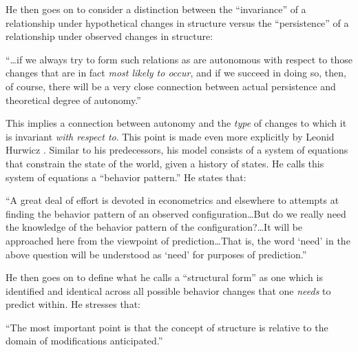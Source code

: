 \documentclass[a4paper,12pt]{article}
\begin{document}
He then goes on to consider a distinction between the ``invariance'' of a relationship under hypothetical changes in structure versus the ``persistence'' of a relationship under observed changes in structure:

\begin{displayquote}
``\ldots if we always try to form such relations as are autonomous with respect to those changes that are in fact \textit{most likely to occur}, and if we succeed in doing so, then, of course, there will be a very close connection between actual persistence and theoretical degree of autonomy.''
\end{displayquote}

This implies a connection between autonomy and the \textit{type} of changes to which it is invariant \textit{with respect to}. This point is made even more explicitly by Leonid Hurwicz \parencite*{Hurwicz1966}. Similar to his predecessors, his model consists of a system of equations that constrain the state of the world, given a history of states. He calls this system of equations a ``behavior pattern.'' He states that:

\begin{displayquote}
``A great deal of effort is devoted in econometrics and elsewhere to attempts at finding the behavior pattern of an observed configuration\ldots But do we really need the knowledge of the behavior pattern of the configuration?\ldots It will be approached here from the viewpoint of prediction\ldots That is, the word `need' in the above question will be understood as `need' for purposes of prediction.''
\end{displayquote}


He then goes on to define what he calls a ``structural form'' as one which is identified and identical across all possible behavior changes that one \textit{needs} to predict within. He stresses that:

\begin{displayquote}
``The most important point is that the concept of structure is relative to the domain of modifications anticipated.''
\end{displayquote}
\end{document}
